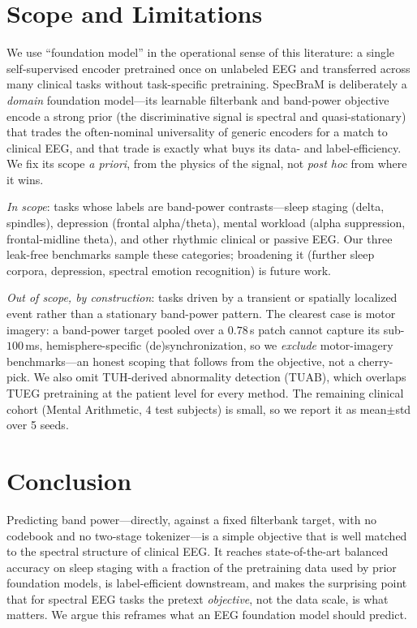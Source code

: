 \documentclass[letterpaper]{article} %
\begin{document}
\section{Scope and Limitations}
We use ``foundation model'' in the operational sense of this literature: a single
self-supervised encoder pretrained once on unlabeled EEG and transferred across many
clinical tasks without task-specific pretraining. SpecBraM is deliberately a
\emph{domain} foundation model---its learnable filterbank and band-power objective
encode a strong prior (the discriminative signal is spectral and quasi-stationary)
that trades the often-nominal universality of generic encoders for a match to
clinical EEG, and that trade is exactly what buys its data- and label-efficiency. We
fix its scope \emph{a priori}, from the physics of the signal, not \emph{post hoc}
from where it wins.

\noindent\emph{In scope}: tasks whose labels are band-power contrasts---sleep
staging (delta, spindles), depression (frontal alpha/theta), mental workload (alpha
suppression, frontal-midline theta), and other rhythmic clinical or passive EEG. Our
three leak-free benchmarks sample these categories; broadening it (further sleep
corpora, depression, spectral emotion recognition) is future work.

\noindent\emph{Out of scope, by construction}: tasks driven by a transient or
spatially localized event rather than a stationary band-power pattern. The clearest
case is motor imagery: a band-power target pooled over a $0.78$\,s patch cannot
capture its sub-$100$\,ms, hemisphere-specific (de)synchronization, so we
\emph{exclude} motor-imagery benchmarks---an honest scoping that follows from the
objective, not a cherry-pick. We also omit TUH-derived abnormality detection
(TUAB), which overlaps TUEG pretraining at the patient level for every method. The
remaining clinical cohort (Mental Arithmetic, $4$ test subjects) is small, so we
report it as mean$\pm$std over 5 seeds.

\section{Conclusion}
Predicting band power---directly, against a fixed filterbank target, with no
codebook and no two-stage tokenizer---is a simple objective that is well matched
to the spectral structure of clinical EEG. It reaches state-of-the-art balanced
accuracy on sleep staging with a fraction of the pretraining data used by prior
foundation models,
is label-efficient downstream, and makes the surprising point that for spectral
EEG tasks the pretext \emph{objective}, not the data scale, is what matters. We
argue this reframes what an EEG foundation model should predict.

\clearpage

\end{document}
